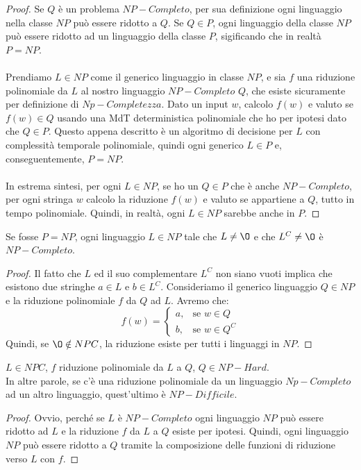 \begin{proof}
	Se $Q$ è un problema $NP-Completo$, per sua definizione ogni linguaggio nella classe $NP$ può essere ridotto a $Q$. Se $Q \in P$, ogni linguaggio della classe $NP$ può essere ridotto ad un linguaggio della classe $P$, sigificando che in realtà $P = NP$. \\ \\ Prendiamo $L \in NP$ come il generico linguaggio in classe $NP$, e sia $f$ una riduzione polinomiale da $L$ al nostro linguaggio $NP-Completo$ $Q$, che esiste sicuramente per definizione di $Np-Completezza$. Dato un input $w$, calcolo $f(w)$ e valuto se $f(w) \in Q$ usando una MdT deterministica polinomiale che ho per ipotesi dato che $Q \in P$. Questo appena descritto è un algoritmo di decisione per $L$ con complessità temporale polinomiale, quindi ogni generico $L \in P$ e, conseguentemente, $P = NP$. \\ \\
	In estrema sintesi, per ogni $L \in NP$, se ho un $Q \in P$ che è anche $NP-Completo$, per ogni stringa $w$ calcolo la riduzione $f(w)$ e valuto se appartiene a $Q$, tutto in tempo polinomiale. Quindi, in realtà, ogni $L \in NP$ sarebbe anche in $P$.

\end{proof}

\begin{lemm}[Implicazione di P=NP]
	Se fosse $P = NP$, ogni linguaggio $L \in NP$ tale che $L \neq \O$ e che $L^C \neq \O$ è $NP-Completo$.
\end{lemm}

\begin{proof}
	Il fatto che $L$ ed il suo complementare $L^C$ non siano vuoti implica che esistono due stringhe $a \in L$ e $b \in L^C$. Consideriamo il generico linguaggio $Q \in NP$ e la riduzione polinomiale $f$ da $Q$ ad $L$. Avremo che:
	$$
		f(w) = \begin{cases} a, & \mbox{se } w \in Q \\ b, & \mbox{se } w \in Q^C \end{cases}
	$$
	Quindi, se $\O \notin NPC$, la riduzione esiste per tutti i linguaggi in $NP$.
\end{proof}

\begin{lemm}
	$L \in NPC$, $f$ riduzione polinomiale da $L$ a $Q$, $Q \in NP-Hard$. \\
	In altre parole, se c'è una riduzione polinomiale da un linguaggio $Np-Completo$ ad un altro linguaggio, quest'ultimo è $NP-Difficile$.
\end{lemm}

\begin{proof}
	Ovvio, perché se $L$ è $NP-Completo$ ogni linguaggio $NP$ può essere ridotto ad $L$ e la riduzione $f$ da $L$ a $Q$ esiste per ipotesi. Quindi, ogni linguaggio $NP$ può essere ridotto a $Q$ tramite la composizione delle funzioni di riduzione verso $L$ con $f$.
\end{proof}
